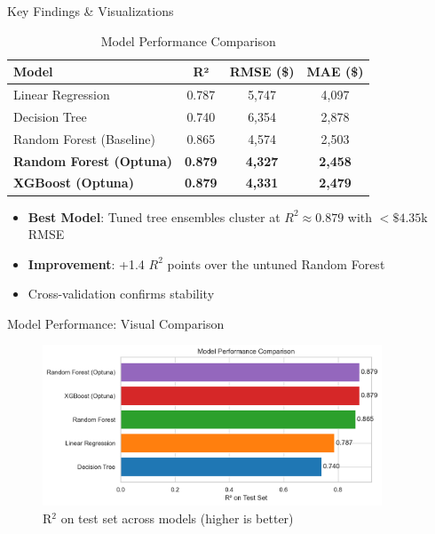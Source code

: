 \documentclass[10pt]{beamer}
\begin{document}
\begin{frame}{Key Findings \& Visualizations}
\begin{table}[h]
\centering
\small
\begin{tabular}{@{}lccc@{}}
\toprule
Model & R² & RMSE (\$) & MAE (\$) \\
\midrule
Linear Regression & 0.787 & 5,747 & 4,097 \\
Decision Tree & 0.740 & 6,354 & 2,878 \\
Random Forest (Baseline) & 0.865 & 4,574 & 2,503 \\
\textbf{Random Forest (Optuna)} & \textbf{0.879} & \textbf{4,327} & \textbf{2,458} \\
\textbf{XGBoost (Optuna)} & \textbf{0.879} & \textbf{4,331} & \textbf{2,479} \\
\bottomrule
\end{tabular}
\caption{Model Performance Comparison}
\end{table}
\begin{itemize}
\item \textbf{Best Model}: Tuned tree ensembles cluster at $R^2 \approx 0.879$ with $<\$4.35$k RMSE
\item \textbf{Improvement}: +1.4 $R^2$ points over the untuned Random Forest
\item Cross-validation confirms stability
\end{itemize}
\end{frame}

\begin{frame}{Model Performance: Visual Comparison}
\begin{figure}
\includegraphics[width=0.9\textwidth]{model_comparison_all.png}
\caption{R$^2$ on test set across models (higher is better)}
\end{figure}
\end{frame}
\end{document}

